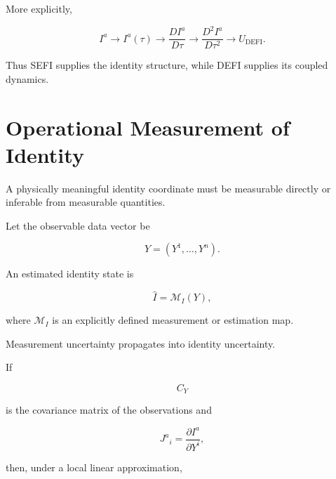 \documentclass[12pt,oneside]{book}
\newcommand{\DEFI}{\mathrm{DEFI}}
\begin{document}
More explicitly,

\begin{equation}
    I^a
    \longrightarrow
    I^a(\tau)
    \longrightarrow
    \frac{DI^a}{D\tau}
    \longrightarrow
    \frac{D^2I^a}{D\tau^2}
    \longrightarrow
    U_{\DEFI}.
    \label{eq:identity-dynamic-progression}
\end{equation}

Thus SEFI supplies the identity structure, while DEFI supplies
its coupled dynamics.


\section{Operational Measurement of Identity}
\label{sec:measurement-identity}

A physically meaningful identity coordinate must be measurable
directly or inferable from measurable quantities.

Let the observable data vector be

\begin{equation}
    Y
    =
    \left(
        Y^1,
        \ldots,
        Y^n
    \right).
\end{equation}

An estimated identity state is

\begin{equation}
    \widehat{I}
    =
    \mathcal{M}_I(Y),
    \label{eq:identity-estimator}
\end{equation}

where \(\mathcal{M}_I\) is an explicitly defined measurement or
estimation map.

Measurement uncertainty propagates into identity uncertainty.

If

\begin{equation}
    C_Y
\end{equation}

is the covariance matrix of the observations and

\begin{equation}
    J^a{}_i
    =
    \frac{\partial I^a}
         {\partial Y^i},
    \label{eq:identity-jacobian}
\end{equation}

then, under a local linear approximation,
\end{document}
